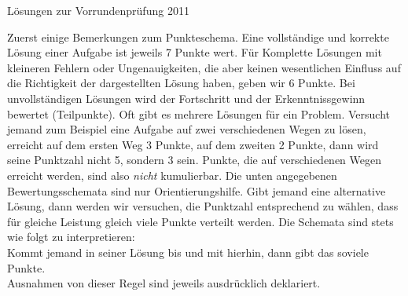 \documentclass[12pt,a4paper]{article}
\theoremstyle{plain}
\theoremstyle{definition}
\theoremstyle{remark}
\begin{document}
\pagestyle{empty}

\begin{center}
{\huge Lösungen zur Vorrundenprüfung 2011} \\
\end{center}
\vspace{8mm}

Zuerst einige Bemerkungen zum Punkteschema. Eine vollständige und korrekte Lösung einer Aufgabe ist jeweils 7 Punkte wert. Für Komplette Lösungen mit kleineren Fehlern oder Ungenauigkeiten, die aber keinen wesentlichen Einfluss auf die Richtigkeit der dargestellten Lösung haben, geben wir 6 Punkte. Bei unvollständigen Lösungen wird der Fortschritt und der Erkenntnissgewinn bewertet (Teilpunkte). Oft gibt es mehrere Lösungen für ein Problem. Versucht jemand zum Beispiel eine Aufgabe auf zwei verschiedenen Wegen zu lösen, erreicht auf dem ersten Weg 3 Punkte, auf dem zweiten 2 Punkte, dann wird seine Punktzahl nicht 5, sondern 3 sein. Punkte, die auf verschiedenen Wegen erreicht werden, sind also \emph{nicht} kumulierbar. Die unten angegebenen Bewertungsschemata sind nur Orientierungshilfe. Gibt jemand eine alternative Lösung, dann werden wir versuchen, die Punktzahl entsprechend zu wählen, dass für gleiche Leistung gleich viele Punkte verteilt werden. Die Schemata sind stets wie folgt zu interpretieren:\\
Kommt jemand in seiner Lösung bis und mit hierhin, dann gibt das soviele Punkte.\\ 
Ausnahmen von dieser Regel sind jeweils ausdrücklich deklariert.

\vspace{8mm}
\end{document}
